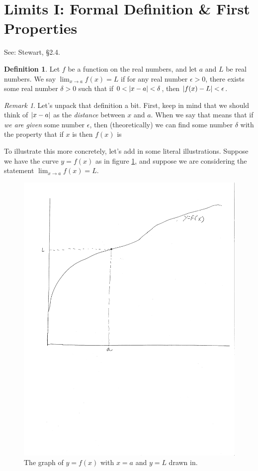 \documentclass[english]{article}
\DeclarePairedDelimiter\abs{\lvert}{\rvert}%
\theoremstyle{remark}
\newtheorem{remark}{Remark}[theorem]
\theoremstyle{definition}
\newtheorem{definition}[theorem]{Definition}
\begin{document}
\section{Limits I: Formal Definition \& First Properties}
See: Stewart, \S2.4.
\begin{definition}\label{def:lim}
	Let $f$ be a function on the real numbers, and let $a$ and $L$ be real numbers. We say $\displaystyle\lim_{x\to a}f(x)=L$ if for any real number $\epsilon>0$, there exists some real number $\delta>0$ such that if $0<\abs{x-a}<\delta$, then $\abs{f(x)-L}<\epsilon$.
\end{definition}
\begin{remark}
Let's unpack that definition a bit. First, keep in mind that we should think of $\abs{x-a}$ as the \emph{distance} between $x$ and $a$. When we say  that means that if \emph{we are given} some number $\epsilon$, then (theoretically) we can find some number $\delta$ with the property that if $x$ is  then $f(x)$ is  

To illustrate this more concretely, let's add in some literal illustrations. Suppose we have the curve $y=f(x)$ as in figure \ref{fig:1graph1}, and suppose we are considering the statement $\displaystyle\lim_{x\to a} f(x)=L$.
\begin{figure}[h!]\centering
\includegraphics[scale=0.5,trim={0 4in 10mm 0},clip]{1graph1} \caption{The graph of $y=f(x)$ with $x=a$ and $y=L$ drawn in.\label{fig:1graph1}}
\end{figure}


\end{remark}
\end{document}
